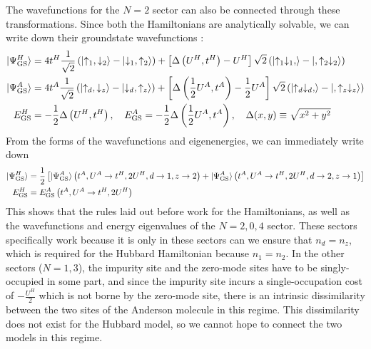 \documentclass{article}
\numberwithin{equation}{section}
\begin{document}
The wavefunctions for the \(N=2\) sector can also be connected through these transformations. Since both the Hamiltonians are analytically solvable, we can write down their groundstate wavefunctions \cite{pavarini}:
\begin{equation}\begin{aligned}
	\ket{\Psi^H_\text{GS}} &= 4t^H\frac{1}{\sqrt 2}\left(\ket{\uparrow_1, \downarrow_2} - \ket{\downarrow_1, \uparrow_2}\right) + \left[\Delta\left( U^H, t^H \right) - U^H\right]{\sqrt 2}\left(\ket{\uparrow_1\downarrow_1, } - \ket{,\uparrow_2\downarrow_2}\right)\\
	\ket{\Psi^A_\text{GS}} &= 4t^A\frac{1}{\sqrt 2}\left(\ket{\uparrow_d, \downarrow_z} - \ket{\downarrow_d, \uparrow_z}\right) + \left[\Delta\left( \frac{1}{2}U^A, t^A \right) - \frac{1}{2}U^A\right]{\sqrt 2}\left(\ket{\uparrow_d\downarrow_d, } - \ket{,\uparrow_z\downarrow_z}\right)\\
	E^H_\text{GS} &=  -\frac{1}{2}\Delta\left( U^H, t^H \right),\quad E^A_\text{GS} =  -\frac{1}{2}\Delta\left( \frac{1}{2}U^A, t^A \right), \quad\Delta(x,y) \equiv \sqrt{x^2 + y^2}\\
\end{aligned}\end{equation}
From the forms of the wavefunctions and eigenenergies, we can immediately write down
\begin{equation}\begin{aligned}
	\ket{\Psi^H_\text{GS}} &= \frac{1}{2}\left[\ket{\Psi^A_\text{GS}}\left(t^A, U^A \to t^H, 2U^H, d \to 1, z \to 2\right) + \ket{\Psi^A_\text{GS}}\left(t^A, U^A \to t^H, 2U^H, d \to 2, z \to 1\right)\right]\\
	E^H_\text{GS} &= E^A_\text{GS}\left(t^A, U^A \to t^H, 2U^H\right)
\end{aligned}\end{equation}
This shows that the rules laid out before work for the Hamiltonians, as well as the wavefunctions and energy eigenvalues of the \(N=2,0,4\) sector. These sectors specifically work because it is only in these sectors can we ensure that \(n_d = n_z\), which is required for the Hubbard Hamiltonian because \(n_1 = n_2\). In the other sectors (\(N=1,3\)), the impurity site and the zero-mode sites have to be singly-occupied in some part, and since the impurity site incurs a single-occupation cost of \(-\frac{U^H}{2}\) which is not borne by the zero-mode site, there is an intrinsic dissimilarity between the two sites of the Anderson molecule in this regime. This dissimilarity does not exist for the Hubbard model, so we cannot hope to connect the two models in this regime.
\end{document}
